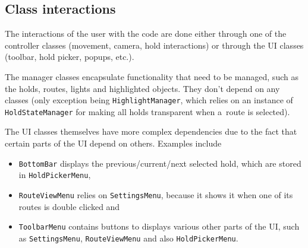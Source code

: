 \subsection{Class interactions}

The interactions of the user with the code are done either through one of the controller classes (movement, camera, hold interactions) or through the UI classes (toolbar, hold picker, popups, etc.).

The manager classes encapsulate functionality that need to be managed, such as the holds, routes, lights and highlighted objects.
They don't depend on any classes (only exception being \verb|HighlightManager|, which relies on an instance of \verb|HoldStateManager| for making all holds transparent when a~route is selected).

The UI classes themselves have more complex dependencies due to the fact that certain parts of the UI depend on others. 
Examples include
\begin{itemize}
		\item \verb|BottomBar| displays the previous/current/next selected hold, which are stored in \verb|HoldPickerMenu|,
		\item \verb|RouteViewMenu| relies on \verb|SettingsMenu|, because it shows it when one of its routes is double clicked and
		\item \verb|ToolbarMenu| contains buttons to displays various other parts of the UI, such as \verb|SettingsMenu|, \verb|RouteViewMenu| and also \verb|HoldPickerMenu|.
\end{itemize}
